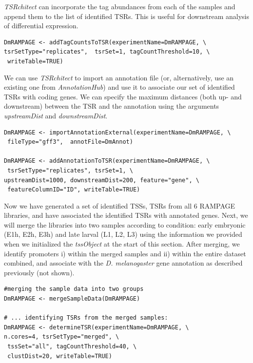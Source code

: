 \documentclass[runningheads,a4paper]{llncs}
\begin{document}
\begin{linenumbers}
\noindent
\textit{TSRchitect} can incorporate the tag abundances from each of the samples and append them to the list of identified TSRs. 
This is useful for downstream analysis of differential expression.

\noindent
\begin{verbatim}
DmRAMPAGE <- addTagCountsToTSR(experimentName=DmRAMPAGE, \
tsrSetType="replicates",  tsrSet=1, tagCountThreshold=10, \
 writeTable=TRUE)
\end{verbatim}

\noindent
We can use \textit{TSRchitect} to import an annotation file (or, alternatively, use an existing one from \textit{AnnotationHub}) and use it to associate our set of identified TSRs with coding genes. 
We can specify the maximum distances (both up- and downstream) between the TSR and the annotation using the arguments \textit{upstreamDist} and \textit{downstreamDist}.

\noindent
\begin{verbatim}
DmRAMPAGE <- importAnnotationExternal(experimentName=DmRAMPAGE, \
 fileType="gff3",  annotFile=DmAnnot)

DmRAMPAGE <- addAnnotationToTSR(experimentName=DmRAMPAGE, \
 tsrSetType="replicates", tsrSet=1, \
upstreamDist=1000, downstreamDist=200, feature="gene", \
 featureColumnID="ID", writeTable=TRUE)
\end{verbatim}

\noindent
Now we have generated a set of identified TSSs, TSRs from all 6 RAMPAGE libraries, and have associated the identified TSRs with annotated genes. 
Next, we will merge the libraries into two samples according to condition: early embryonic (E1h, E2h, E3h) and late larval (L1, L2, L3) using the information we provided when we initialized the \textit{tssObject} at the start of this section.
After merging, we identify promoters i) within the merged samples and ii) within the entire dataset combined, and associate with the \textit{D. melanogaster} gene annotation as described previously (not shown).

\noindent
\begin{verbatim}
#merging the sample data into two groups
DmRAMPAGE <- mergeSampleData(DmRAMPAGE)

# ... identifying TSRs from the merged samples:
DmRAMPAGE <- determineTSR(experimentName=DmRAMPAGE, \
n.cores=4, tsrSetType="merged", \
 tssSet="all", tagCountThreshold=40, \
 clustDist=20, writeTable=TRUE)
\end{verbatim}


\end{linenumbers}
\end{document}
